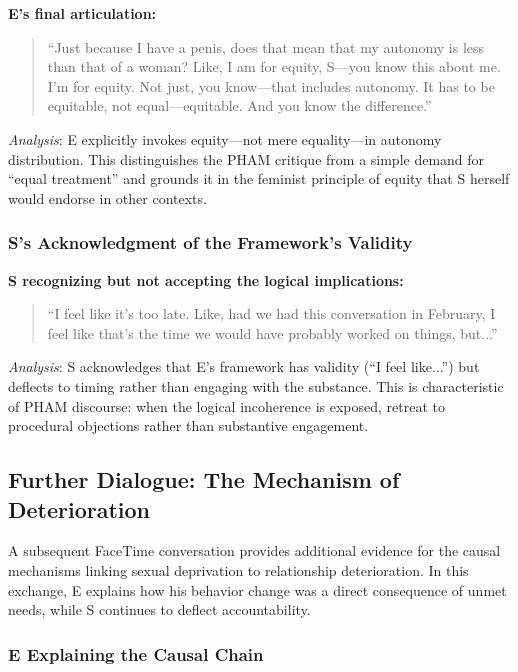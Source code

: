 \documentclass[12pt, letterpaper]{article}
\begin{document}
\textbf{E's final articulation:}
\begin{quote}
``Just because I have a penis, does that mean that my autonomy is less than that of a woman? Like, I am for equity, S---you know this about me. I'm for equity. Not just, you know---that includes autonomy. It has to be equitable, not equal---equitable. And you know the difference.''
\end{quote}

\textit{Analysis}: E explicitly invokes equity---not mere equality---in autonomy distribution. This distinguishes the PHAM critique from a simple demand for ``equal treatment'' and grounds it in the feminist principle of equity that S herself would endorse in other contexts.

\subsubsection{S's Acknowledgment of the Framework's Validity}

\textbf{S recognizing but not accepting the logical implications:}
\begin{quote}
``I feel like it's too late. Like, had we had this conversation in February, I feel like that's the time we would have probably worked on things, but...''
\end{quote}

\textit{Analysis}: S acknowledges that E's framework has validity (``I feel like...'') but deflects to timing rather than engaging with the substance. This is characteristic of PHAM discourse: when the logical incoherence is exposed, retreat to procedural objections rather than substantive engagement.

\subsection{Further Dialogue: The Mechanism of Deterioration}

A subsequent FaceTime conversation provides additional evidence for the causal mechanisms linking sexual deprivation to relationship deterioration. In this exchange, E explains how his behavior change was a direct consequence of unmet needs, while S continues to deflect accountability.

\subsubsection{E Explaining the Causal Chain}
\end{document}
